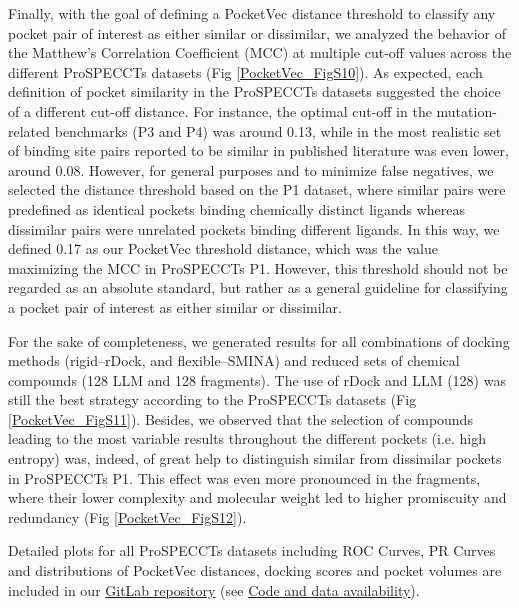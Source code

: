 Finally, with the goal of defining a PocketVec distance threshold to classify any pocket pair of interest as either similar or dissimilar, we analyzed the behavior of the Matthew's Correlation Coefficient (MCC) at multiple cut-off values across the different ProSPECCTs datasets (Fig \ref{PocketVec_FigS10}). As expected, each definition of pocket similarity in the ProSPECCTs datasets suggested the choice of a different cut-off distance. For instance, the optimal cut-off in the mutation-related benchmarks (P3 and P4) was around 0.13, while in the most realistic set of binding site pairs reported to be similar in published literature was even lower, around 0.08. However, for general purposes and to minimize false negatives, we selected the distance threshold based on the P1 dataset, where similar pairs were predefined as identical pockets binding chemically distinct ligands whereas dissimilar pairs were unrelated pockets binding different ligands. In this way, we defined 0.17 as our PocketVec threshold distance, which was the value maximizing the MCC in ProSPECCTs P1. However, this threshold should not be regarded as an absolute standard, but rather as a general guideline for classifying a pocket pair of interest as either similar or dissimilar.

For the sake of completeness, we generated results for all combinations of docking methods (rigid--rDock, and flexible--SMINA) and reduced sets of chemical compounds (128 LLM and 128 fragments). The use of rDock and LLM (128) was still the best strategy according to the ProSPECCTs datasets (Fig \ref{PocketVec_FigS11}). Besides, we observed that the selection of compounds leading to the most variable results throughout the different pockets (i.e. high entropy) was, indeed, of great help to distinguish similar from dissimilar pockets in ProSPECCTs P1. This effect was even more pronounced in the fragments, where their lower complexity and molecular weight led to higher promiscuity and redundancy (Fig \ref{PocketVec_FigS12}).

Detailed plots for all ProSPECCTs datasets including ROC Curves, PR Curves and distributions of PocketVec distances, docking scores and pocket volumes are included in our \href{https://gitlabsbnb.irbbarcelona.org/acomajuncosa/pocketvec}{GitLab repository} (see \hyperref[PocketVec_Code]{Code and data availability}). 





